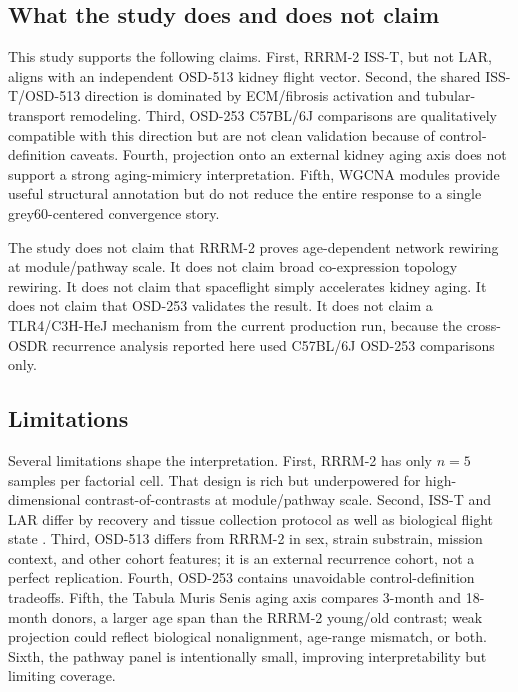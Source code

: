 \documentclass[11pt]{article}
\begin{document}
\subsection{What the study does and does not claim}

This study supports the following claims. First, RRRM-2 ISS-T, but not LAR, aligns with an independent OSD-513 kidney flight vector. Second, the shared ISS-T/OSD-513 direction is dominated by ECM/fibrosis activation and tubular-transport remodeling. Third, OSD-253 C57BL/6J comparisons are qualitatively compatible with this direction but are not clean validation because of control-definition caveats. Fourth, projection onto an external kidney aging axis does not support a strong aging-mimicry interpretation. Fifth, WGCNA modules provide useful structural annotation but do not reduce the entire response to a single grey60-centered convergence story.

The study does not claim that RRRM-2 proves age-dependent network rewiring at module/pathway scale. It does not claim broad co-expression topology rewiring. It does not claim that spaceflight simply accelerates kidney aging. It does not claim that OSD-253 validates the result. It does not claim a TLR4/C3H-HeJ mechanism from the current production run, because the cross-OSDR recurrence analysis reported here used C57BL/6J OSD-253 comparisons only.

\subsection{Limitations}

Several limitations shape the interpretation. First, RRRM-2 has only $n=5$ samples per factorial cell. That design is rich but underpowered for high-dimensional contrast-of-contrasts at module/pathway scale. Second, ISS-T and LAR differ by recovery and tissue collection protocol as well as biological flight state \citep{galazka2020rnaseq}. Third, OSD-513 differs from RRRM-2 in sex, strain substrain, mission context, and other cohort features; it is an external recurrence cohort, not a perfect replication. Fourth, OSD-253 contains unavoidable control-definition tradeoffs. Fifth, the Tabula Muris Senis aging axis compares 3-month and 18-month donors, a larger age span than the RRRM-2 young/old contrast; weak projection could reflect biological nonalignment, age-range mismatch, or both. Sixth, the pathway panel is intentionally small, improving interpretability but limiting coverage.
\end{document}
